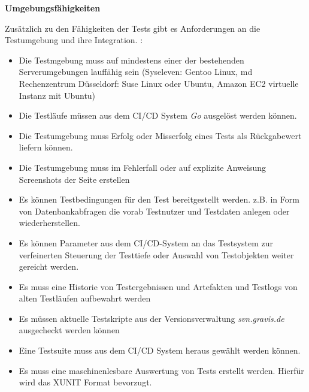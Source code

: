\textbf{Umgebungsfähigkeiten}

Zusätzlich zu den Fähigkeiten der Tests gibt es Anforderungen an die
Testumgebung und ihre Integration. :

\begin{itemize}
\itemsep1pt\parskip0pt
\item
  Die Testmgebung muss auf mindestens einer der bestehenden
  Serverumgebungen lauffähig sein (Syseleven: Gentoo Linux, md
  Rechenzentrum Düsseldorf: Suse Linux oder Ubuntu, Amazon EC2 virtuelle
  Instanz mit Ubuntu)
\item
  Die Testläufe müssen aus dem CI/CD System \emph{Go} ausgelöst werden
  können.
\item
  Die Testumgebung muss Erfolg oder Misserfolg eines Tests als
  Rückgabewert liefern können.
\item
  Die Testumgebung muss im Fehlerfall oder auf explizite Anweisung
  Screenshots der Seite erstellen
\item
  Es können Testbedingungen für den Test bereitgestellt werden. z.B. in
  Form von Datenbankabfragen die vorab Testnutzer und Testdaten anlegen
  oder wiederherstellen.
\item
  Es können Parameter aus dem CI/CD-System an das Testsystem zur
  verfeinerten Steuerung der Testtiefe oder Auswahl von Testobjekten
  weiter gereicht werden.
\item
  Es muss eine Historie von Testergebnissen und Artefakten und Testlogs
  von alten Testläufen aufbewahrt werden
\item
  Es müssen aktuelle Testskripte aus der Versionsverwaltung
  \emph{svn.gravis.de} ausgecheckt werden können
\item
  Eine Testsuite muss aus dem CI/CD System heraus gewählt werden können.
\item
  Es muss eine maschinenlesbare Auswertung von Tests erstellt werden.
  Hierfür wird das XUNIT Format bevorzugt.
\end{itemize}
